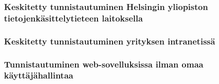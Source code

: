 

\subsubsection{Keskitetty tunnistautuminen Helsingin yliopiston tietojenkäsittelytieteen laitoksella}


\subsubsection{Keskitetty tunnistautuminen yrityksen intranetissä}


\subsubsection{Tunnistautuminen web-sovelluksissa ilman omaa käyttäjähallintaa}
